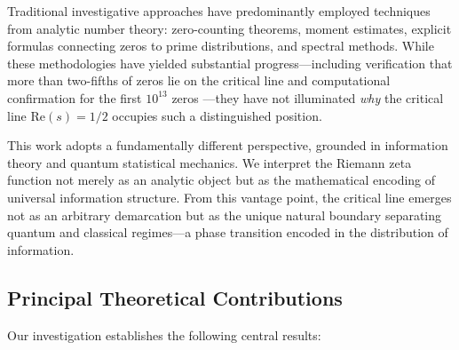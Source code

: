 \documentclass[12pt]{article}
\theoremstyle{plain}
\theoremstyle{definition}
\begin{document}
Traditional investigative approaches have predominantly employed techniques from analytic number theory: zero-counting theorems, moment estimates, explicit formulas connecting zeros to prime distributions, and spectral methods. While these methodologies have yielded substantial progress—including verification that more than two-fifths of zeros lie on the critical line \cite{conrey1989} and computational confirmation for the first $10^{13}$ zeros \cite{odlyzko1987}—they have not illuminated \emph{why} the critical line $\text{Re}(s)=1/2$ occupies such a distinguished position.

This work adopts a fundamentally different perspective, grounded in information theory and quantum statistical mechanics. We interpret the Riemann zeta function not merely as an analytic object but as the mathematical encoding of universal information structure. From this vantage point, the critical line emerges not as an arbitrary demarcation but as the unique natural boundary separating quantum and classical regimes—a phase transition encoded in the distribution of information.

\subsection{Principal Theoretical Contributions}

Our investigation establishes the following central results:
\end{document}
